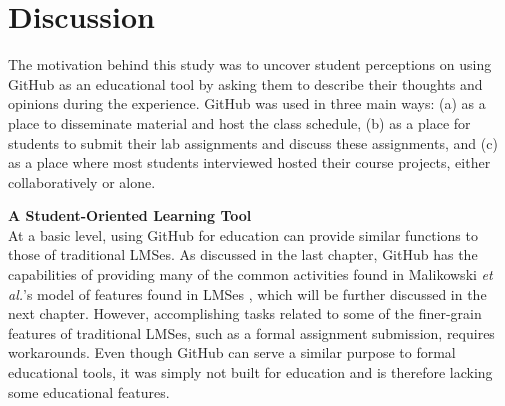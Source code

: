 



\section{Discussion}
The motivation behind this study was to uncover student perceptions on using GitHub as an educational tool by asking them to describe their thoughts and opinions during the experience. GitHub was used in three main ways: (a) as a place to disseminate material and host the class schedule, (b) as a place for students to submit their lab assignments and discuss these assignments, and (c) as a place where most students interviewed hosted their course projects, either collaboratively or alone.

\textbf{A Student-Oriented Learning Tool} \\
At a basic level, using GitHub for education can provide similar functions to those of traditional LMSes. As discussed in the last chapter, GitHub has the capabilities of providing many of the common activities found in Malikowski \textit{et al.}'s model of features found in LMSes \cite{malikowski2007model}, which will be further discussed in the next chapter. However, accomplishing tasks related to some of the finer-grain features of traditional LMSes, such as a formal assignment submission, requires workarounds. Even though GitHub can serve a similar purpose to formal educational tools, it was simply not built for education and is therefore lacking some educational features.

